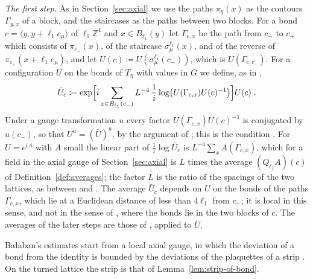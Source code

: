 \documentclass[11pt]{preprint}
\numberwithin{equation}{section}
\theoremstyle{definition}
\theoremstyle{remark}
\theoremstyle{plain}
\begin{document}
\emph{The first step.} As in Section~\ref{sec:axial} we use the paths $\pi_y(x)$ as the contours $\Gamma_{y,x}$ of a block, and the staircases as the paths between two blocks. For a bond $c = \langle y, y + \ell_1e_\mu\rangle$ of $\ell_1\mathbb Z^4$ and $x \in B_{\ell_1}(y)$ let $\Gamma_{c,x}$ be the path from $c_-$ to $c_+$ which consists of $\pi_{c_-}(x)$, of the staircase $\sigma^{\ell_1}_\mu(x)$, and of the reverse of $\pi_{c_+}(x + \ell_1e_\mu)$, and let $U(c) \coloneqq U(\sigma^{\ell_1}_\mu(c_-))$, which is $U(\Gamma_{c,c_-})$. For a configuration $U$ on the bonds of $T_\eta$ with values in $G$ we define, as in \cite[(15)]{BalabanAVG},
\begin{equation}\label{eq:group-average}
    \bar U_c \coloneqq \exp\Bigl[i\sum_{x \in B_{\ell_1}(c_-)}L^{-4}\,\frac1i\log\bigl(U(\Gamma_{c,x})U(c)^{-1}\bigr)\Bigr]U(c)\;.
\end{equation}
Under a gauge transformation $u$ every factor $U(\Gamma_{c,x})U(c)^{-1}$ is conjugated by $u(c_-)$, so that $\overline{U^u} = (\bar U)^u$, by the argument of \cite[p.~24]{BalabanAVG}; this is the condition \cite[(11)]{BalabanAVG}. For $U = e^{iA}$ with $A$ small the linear part of $\frac1i\log\bar U_c$ is $L^{-4}\sum_xA(\Gamma_{c,x})$, which for a field in the axial gauge of Section~\ref{sec:axial} is $L$ times the average $(Q_{\ell_1}A)(c)$ of Definition~\ref{def:averages}; the factor $L$ is the ratio of the spacings of the two lattices, as between \cite[(14)]{BalabanAVG} and \cite[(15)]{BalabanAVG}. The average $\bar U_c$ depends on $U$ on the bonds of the paths $\Gamma_{c,x}$, which lie at a Euclidean distance of less than $4\ell_1$ from $c_-$; it is local in this sense, and not in the sense of \cite[p.~24]{BalabanAVG}, where the bonds lie in the two blocks of $c$. The averages of the later steps are those of \cite[(43)]{BalabanAVG}, applied to $\bar U$.

Ba{\l}aban's estimates start from a local axial gauge, in which the deviation of a bond from the identity is bounded by the deviations of the plaquettes of a strip \cite[pp.~24--25]{BalabanAVG}. On the turned lattice the strip is that of Lemma~\ref{lem:strip-of-bond}.
\end{document}
